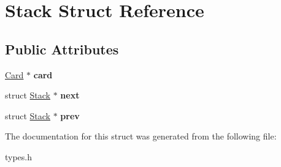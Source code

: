 \hypertarget{struct_stack}{\section{Stack Struct Reference}
\label{struct_stack}
}
\subsection*{Public Attributes}
\begin{DoxyCompactItemize}
\item 
\hypertarget{struct_stack_a45e1bb42aaa8479e2177eb1c102eb5ea}{\hyperlink{struct_card}{Card} $\ast$ {\bfseries card}}\label{struct_stack_a45e1bb42aaa8479e2177eb1c102eb5ea}

\item 
\hypertarget{struct_stack_a367ee07bba3354478a9216f5ee6d5c6b}{struct \hyperlink{struct_stack}{Stack} $\ast$ {\bfseries next}}\label{struct_stack_a367ee07bba3354478a9216f5ee6d5c6b}

\item 
\hypertarget{struct_stack_adad1404823e2e2e5a7be1b99d6973c04}{struct \hyperlink{struct_stack}{Stack} $\ast$ {\bfseries prev}}\label{struct_stack_adad1404823e2e2e5a7be1b99d6973c04}

\end{DoxyCompactItemize}


The documentation for this struct was generated from the following file\-:\begin{DoxyCompactItemize}
\item 
types.\-h\end{DoxyCompactItemize}
